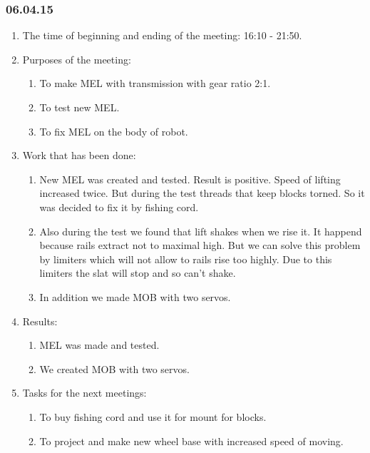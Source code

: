 \subsubsection{06.04.15}
\begin{enumerate}
	
	\item The time of beginning and ending of the meeting: 16:10 - 21:50.
	
	\item Purposes of the meeting: 
	\begin{enumerate}
		
		\item To make MEL with transmission with gear ratio 2:1.
		
		\item To test new MEL.
		
        \item To fix MEL on the body of robot.
		
	\end{enumerate}

	\item Work that has been done:
	\begin{enumerate}
		
		\item New MEL was created and tested. Result is positive. Speed of lifting increased twice. But during the test threads that keep blocks torned. So it was decided to fix it by fishing cord.
		
		\item Also during the test we found that lift shakes when we rise it. It happend because rails extract not to maximal high. But we can solve this problem by limiters which will not allow to rails rise too highly. Due to this limiters the slat will stop and so can't shake.
		
		\item In addition we made MOB with two servos.

	\end{enumerate}
	
	\item Results:
	\begin{enumerate}
		
		\item MEL was made and tested.
		
		\item We created MOB with two servos.

	\end{enumerate}
	
	\item Tasks for the next meetings:
	\begin{enumerate}
		
		\item To buy fishing cord and use it for mount for blocks.
		
		\item To project and make new wheel base with increased speed of moving.

	\end{enumerate}
\end{enumerate}
\fillpage
